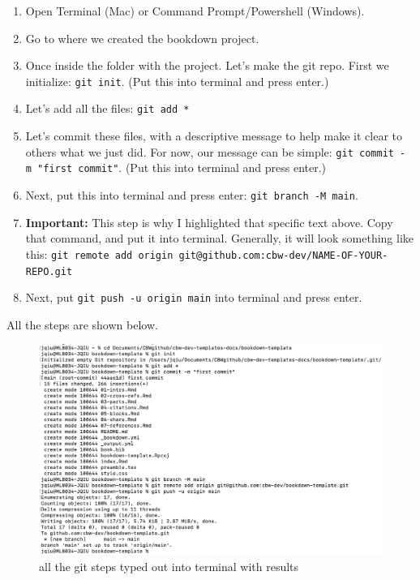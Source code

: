 \documentclass[
]{book}
\theoremstyle{definition}
\theoremstyle{definition}
\theoremstyle{definition}
\theoremstyle{definition}
\theoremstyle{remark}
\begin{document}
\begin{enumerate}
\def\labelenumi{\arabic{enumi}.}
\setcounter{enumi}{4}
\item
  Open Terminal (Mac) or Command Prompt/Powershell (Windows).
\item
  Go to where we created the bookdown project.
\item
  Once inside the folder with the project. Let's make the git repo. First we initialize: \texttt{git\ init}. (Put this into terminal and press enter.)
\item
  Let's add all the files: \texttt{git\ add\ *}
\item
  Let's commit these files, with a descriptive message to help make it clear to others what we just did. For now, our message can be simple: \texttt{git\ commit\ -m\ "first\ commit"}. (Put this into terminal and press enter.)
\item
  Next, put this into terminal and press enter: \texttt{git\ branch\ -M\ main}.
\item
  \textbf{Important:} This step is why I highlighted that specific text above. Copy that command, and put it into terminal. Generally, it will look something like this: \texttt{git\ remote\ add\ origin\ git@github.com:cbw-dev/NAME-OF-YOUR-REPO.git}
\item
  Next, put \texttt{git\ push\ -u\ origin\ main} into terminal and press enter.
\end{enumerate}

All the steps are shown below.

\begin{figure}
\centering
\includegraphics{img/git-instruct/git-instructions-in-terminal.png}
\caption{all the git steps typed out into terminal with results}
\end{figure}
\end{document}
